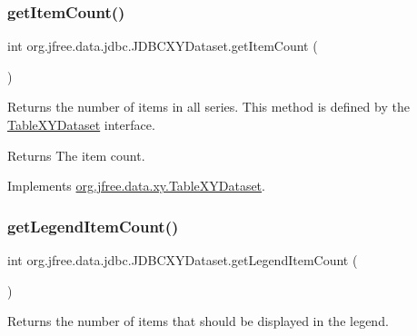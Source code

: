 \subsubsection{\texorpdfstring{get\+Item\+Count()}{getItemCount()}\hspace{0.1cm}{\footnotesize\ttfamily [2/2]}}
{\footnotesize\ttfamily int org.\+jfree.\+data.\+jdbc.\+J\+D\+B\+C\+X\+Y\+Dataset.\+get\+Item\+Count (\begin{DoxyParamCaption}{ }\end{DoxyParamCaption})}

Returns the number of items in all series. This method is defined by the \mbox{\hyperlink{}{Table\+X\+Y\+Dataset}} interface.

\begin{DoxyReturn}{Returns}
The item count. 
\end{DoxyReturn}


Implements \mbox{\hyperlink{interfaceorg_1_1jfree_1_1data_1_1xy_1_1_table_x_y_dataset_ad9cd378be982c1d61cfb93a16370b6f0}{org.\+jfree.\+data.\+xy.\+Table\+X\+Y\+Dataset}}.

\mbox{\label{classorg_1_1jfree_1_1data_1_1jdbc_1_1_j_d_b_c_x_y_dataset_ac31e8c503020d258f3d393bcfa739216}} 
\subsubsection{\texorpdfstring{get\+Legend\+Item\+Count()}{getLegendItemCount()}}
{\footnotesize\ttfamily int org.\+jfree.\+data.\+jdbc.\+J\+D\+B\+C\+X\+Y\+Dataset.\+get\+Legend\+Item\+Count (\begin{DoxyParamCaption}{ }\end{DoxyParamCaption})}

Returns the number of items that should be displayed in the legend.

